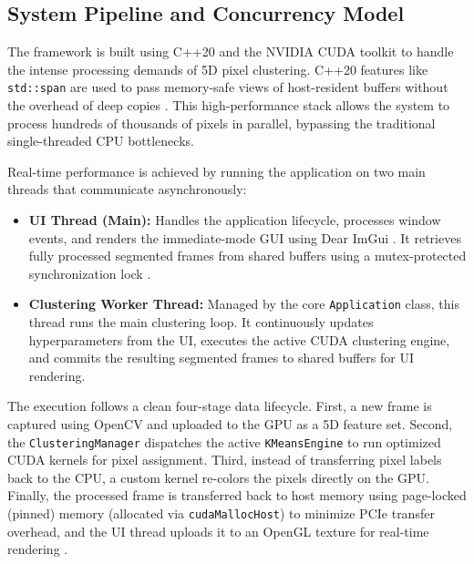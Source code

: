 \subsection{System Pipeline and Concurrency Model}
The framework is built using C++20 and the NVIDIA CUDA toolkit \cite{CudaGuide} to handle the intense processing demands of 5D pixel clustering. C++20 features like \texttt{std::span} are used to pass memory-safe views of host-resident buffers without the overhead of deep copies \cite{stroustrup2022tour}. This high-performance stack allows the system to process hundreds of thousands of pixels in parallel, bypassing the traditional single-threaded CPU bottlenecks.

Real-time performance is achieved by running the application on two main threads that communicate asynchronously:
\begin{itemize}
    \item \begin{minipage}[t]{\linewidth}
    \textbf{UI Thread (Main):} Handles the application lifecycle, processes window events, and renders the immediate-mode GUI using Dear ImGui \cite{ImGui}. It retrieves fully processed segmented frames from shared buffers using a mutex-protected synchronization lock \cite{williams2019c++}.
    \end{minipage}
    \item \begin{minipage}[t]{\linewidth}
    \textbf{Clustering Worker Thread:} Managed by the core \texttt{Application} class, this thread runs the main clustering loop. It continuously updates hyperparameters from the UI, executes the active CUDA clustering engine, and commits the resulting segmented frames to shared buffers for UI rendering.
    \end{minipage}
\end{itemize}

The execution follows a clean four-stage data lifecycle. First, a new frame is captured using OpenCV \cite{Bradski2000} and uploaded to the GPU as a 5D feature set. Second, the \texttt{ClusteringManager} dispatches the active \texttt{KMeansEngine} to run optimized CUDA kernels for pixel assignment. Third, instead of transferring pixel labels back to the CPU, a custom kernel re-colors the pixels directly on the GPU. Finally, the processed frame is transferred back to host memory using page-locked (pinned) memory (allocated via \texttt{cudaMallocHost}) to minimize PCIe transfer overhead, and the UI thread uploads it to an OpenGL texture for real-time rendering \cite{CudaGuide}.

